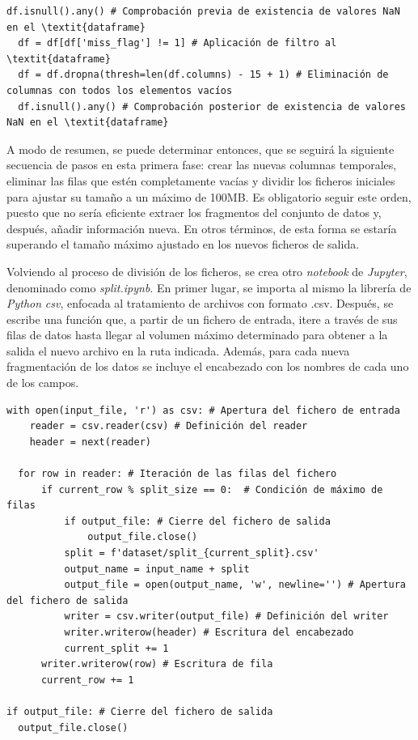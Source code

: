 \vspace{3mm}

\begin{lstlisting}[style=Python, caption={Eliminación de valores NaN}]
  df.isnull().any() # Comprobación previa de existencia de valores NaN en el \textit{dataframe}
  df = df[df['miss_flag'] != 1] # Aplicación de filtro al \textit{dataframe}
  df = df.dropna(thresh=len(df.columns) - 15 + 1) # Eliminación de columnas con todos los elementos vacíos
  df.isnull().any() # Comprobación posterior de existencia de valores NaN en el \textit{dataframe}
\end{lstlisting}

\vspace{3mm}

A modo de resumen, se puede determinar entonces, que se seguirá la siguiente secuencia de pasos en esta primera fase: crear las nuevas columnas temporales, eliminar las filas que estén completamente vacías y dividir los ficheros iniciales para ajustar su tamaño a un máximo de 100MB. Es obligatorio seguir este orden, puesto que no sería eficiente extraer los fragmentos del conjunto de datos y, después, añadir información nueva. En otros términos, de esta forma se estaría superando el tamaño máximo ajustado en los nuevos ficheros de salida.

\vspace{3mm}

Volviendo al proceso de división de los ficheros, se crea otro \textit{notebook} de \textit{Jupyter}, denominado como \textit{split.ipynb}. En primer lugar, se importa al mismo la librería de \textit{Python} \textit{csv}, enfocada al tratamiento de archivos con formato .csv. Después, se escribe una función que, a partir de un fichero de entrada, itere a través de sus filas de datos hasta llegar al volumen máximo determinado para obtener a la salida el nuevo archivo en la ruta indicada. Además, para cada nueva fragmentación de los datos se incluye el encabezado con los nombres de cada uno de los campos.

\vspace{3mm}

\begin{lstlisting}[style=Python, caption={Fragmentación de ficheros iniciales}]
  with open(input_file, 'r') as csv: # Apertura del fichero de entrada
    reader = csv.reader(csv) # Definición del reader
    header = next(reader)  

  for row in reader: # Iteración de las filas del fichero
      if current_row % split_size == 0:  # Condición de máximo de filas
          if output_file: # Cierre del fichero de salida 
              output_file.close()
          split = f'dataset/split_{current_split}.csv'
          output_name = input_name + split
          output_file = open(output_name, 'w', newline='') # Apertura del fichero de salida
          writer = csv.writer(output_file) # Definición del writer
          writer.writerow(header) # Escritura del encabezado
          current_split += 1
      writer.writerow(row) # Escritura de fila
      current_row += 1

if output_file: # Cierre del fichero de salida
  output_file.close()
\end{lstlisting}

